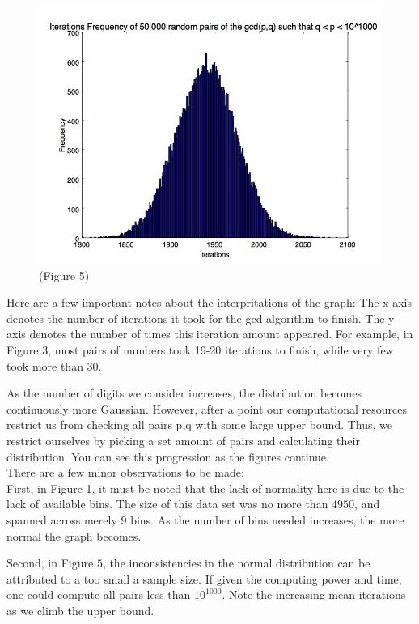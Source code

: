 \documentclass[11pt]{article}
\begin{document}
	\begin{figure}
		\centering

		\includegraphics[scale=.4]{1000_digit_numbers.jpg}
		\center \tiny(Figure 5)
		
	\end{figure}
	\newpage
	Here are a few important notes about the interpritations of the graph:
	The x-axis denotes the number of iterations it took for the gcd algorithm to finish. The y-axis denotes the number of times this iteration amount appeared.
	For example, in Figure 3, most pairs of numbers took 19-20 iterations to finish, while very few took more than 30. 
	
	As the number of digits we consider increases, the distribution	 becomes continuously more Gaussian. However, after a point our computational resources restrict us from checking all pairs p,q with some large upper bound. Thus, we restrict ourselves by picking a set amount of pairs and calculating their distribution. You can see this progression as the figures continue.\\
	
	There are a few minor observations to be made:\\
	
	 First, in Figure 1, it must be noted that the lack of normality here is due to the lack of available bins. The size of this data set was no more than $4950$, and spanned across merely $9$ bins. As the number of bins needed increases, the more normal the graph becomes. 
	
	 Second, in Figure $5$, the inconsistencies in the normal distribution can be attributed to a too small a sample size. If given the computing power and time, one could compute all pairs less than $10^{1000}$. Note the increasing mean iterations as we climb the upper bound.
\end{document}
